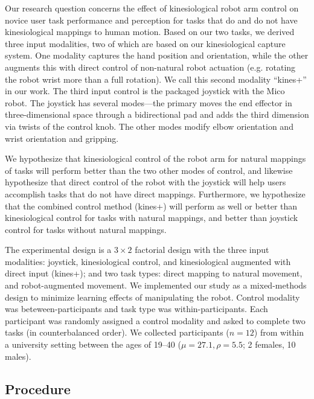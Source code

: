 \documentclass{sigchi}
\begin{document}
Our research question concerns the effect of kinesiological robot arm control on novice user task performance and perception for tasks that do and do not have kinesiological mappings to human motion.  Based on our two tasks, we derived three input modalities, two of which are based on our kinesiological capture system.  One modality captures the hand position and orientation, while the other augments this with direct control of non-natural robot actuation (e.g. rotating the robot wrist more than a full rotation).  We call this second modality ``kines+'' in our work. The third input control is the packaged joystick with the Mico robot.  The joystick has several modes---the primary moves the end effector in three-dimensional space through a bidirectional pad and adds the third dimension via twists of the control knob.  The other modes modify elbow orientation and wrist orientation and gripping.  

We hypothesize that kinesiological control of the robot arm for natural mappings of tasks will perform better than the two other modes of control, and likewise hypothesize that direct control of the robot with the joystick will help users accomplish tasks that do not have direct mappings. Furthermore, we hypothesize that the combined control method (kines+) will perform as well or better than kinesiological control for tasks with natural mappings, and better than joystick control for tasks without natural mappings.

The experimental design is a $3\times2$ factorial design with the three input modalities: joystick, kinesiological control, and kinesiological augmented with direct input (kines+); and two task types: direct mapping to natural movement, and robot-augmented movement.  We implemented our study as a mixed-methods design to minimize learning effects of manipulating the robot. Control modality was beteween-participants and task type was within-participants. Each participant was randomly assigned a control modality and asked to complete two tasks (in counterbalanced order).  We collected participants ($n=12$) from within a university setting between the ages of 19--40 ($\mu = 27.1, \rho = 5.5$; 2 females, 10 males).


\subsection{Procedure}
\end{document}
